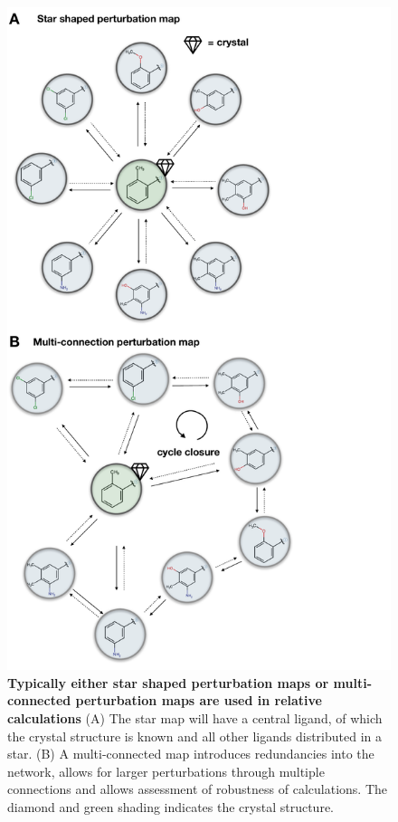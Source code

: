 \documentclass[9pt,bestpractices]{livecoms}
\begin{document}
\begin{figure}
    \includegraphics[width=0.95\linewidth]{figures/network.pdf}
    \caption{\textbf{Typically either star shaped perturbation maps or multi-connected perturbation maps are used in relative calculations} (A) The star map will have a central ligand, of which the crystal structure is known and all other ligands distributed in a star. (B) A multi-connected map introduces redundancies into the network, allows for larger perturbations through multiple connections and allows assessment of robustness of calculations. The diamond and green shading indicates the crystal structure.}
    \label{fig:map}
\end{figure}
\end{document}
